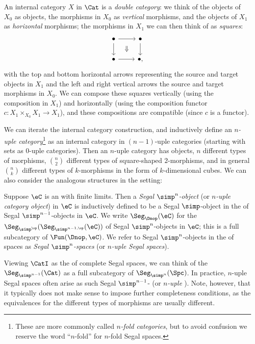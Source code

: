 \documentclass[a4paper,12pt]{article}
\begin{document}
\begin{ex}
  An internal category $X$ in $\Cat$ is a \emph{double category}: we
  think of the objects of $X_{0}$ as objects, the morphisms in $X_{0}$
  as \emph{vertical} morphisms, and the objects of $X_{1}$ as
  \emph{horizontal} morphisms; the morphisms in $X_{1}$ we can then
  think of as \emph{squares}:
  \[
    \begin{tikzcd}
      \bullet \ar[r] \ar[d] \ar[dr, phantom, "\Downarrow"] & \bullet \ar[d] \\
      \bullet \ar[r] & \bullet,
    \end{tikzcd}
  \]
  with the top and bottom horizontal arrows representing the source
  and target objects in $X_{1}$ and the left and right vertical arrows
  the source and target morphisms in $X_{0}$. We can compose these
  squares vertically (using the composition in $X_{1}$) and
  horizontally (using the composition functor
  $c \colon X_{1} \times_{X_{0}} X_{1} \to X_{1}$), and these
  compositions are compatible (since $c$ is a functor).
\end{ex}

We can iterate the internal category construction, and inductively
define an \emph{$n$-uple category}\footnote{These are more commonly
  called \emph{$n$-fold categories}, but to avoid confusion we reserve
  the word ``$n$-fold'' for $n$-fold Segal spaces.} as an internal
category in $(n-1)$-uple categories (starting with sets as $0$-uple
categories). 
Then an $n$-uple category has objects, $n$ different
types of morphisms, $\binom{n}{2}$ different types of square-shaped
$2$-morphisms, and in general $\binom{n}{k}$ different types of
$k$-morphisms in the form of $k$-dimensional cubes. We can also
consider the analogous structures in the \icatl{} setting:
\begin{defn}
  Suppose $\eC$ is an \icat{} with finite limits. Then a \emph{Segal
    $\simp^{n}$-object} (or \emph{$n$-uple category object}) in $\eC$
  is inductively defined to be a Segal $\simp$-object in the \icat{}
  of Segal $\simp^{n-1}$-objects in $\eC$. We write
  $\Seg_{\Dnop}(\eC)$ for the \icat{}
  $\Seg_{\simp^{\op}}(\Seg_{\simp^{n-1,\op}}(\eC))$ of Segal $\simp^{n}$-objects in
  $\eC$; this is a full subcategory of $\Fun(\Dnop, \eC)$. We refer to
  Segal $\simp^{n}$-objects in the \icat{} of spaces as \emph{Segal
    $\simp^{n}$-spaces} (or \emph{$n$-uple
  Segal spaces}).
\end{defn}

\begin{remark}
  Viewing $\CatI$ as the \icat{} of complete Segal spaces, we can
  think of the \icat{} $\Seg_{\simp^{n-1}}(\Cat)$ as a full subcategory of
  $\Seg_{\simp^{n}}(\Spc)$. In practice, $n$-uple Segal spaces often
  arise as such Segal $\simp^{n-1}$-\icats{} (or \emph{$n$-uple
    \icats{}}). Note, however, that it typically does not make sense
  to impose further completeness conditions, as the equivalences for
  the different types of morphisms are usually different.
\end{remark}
\end{document}
